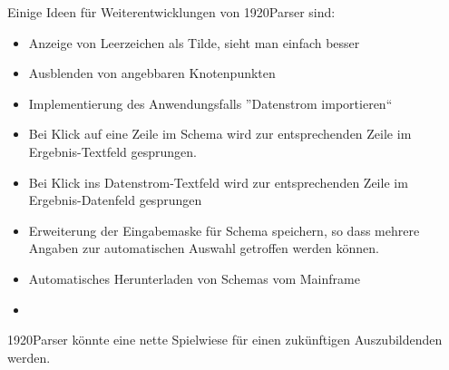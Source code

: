 Einige Ideen für Weiterentwicklungen von 1920Parser sind:
\begin{itemize}
\item Anzeige von Leerzeichen als Tilde, sieht man einfach besser
\item Ausblenden von angebbaren Knotenpunkten
\item Implementierung des Anwendungsfalls ''Datenstrom importieren``
\item Bei Klick auf eine Zeile im Schema wird zur entsprechenden Zeile im Ergebnis-Textfeld gesprungen.
\item Bei Klick ins Datenstrom-Textfeld wird zur entsprechenden Zeile im Ergebnis-Datenfeld gesprungen
\item Erweiterung der Eingabemaske für Schema speichern, so dass mehrere Angaben zur automatischen Auswahl getroffen werden können.
\item Automatisches Herunterladen von Schemas vom Mainframe
\item 
\end{itemize}
1920Parser könnte eine nette Spielwiese für einen zukünftigen Auszubildenden werden.






